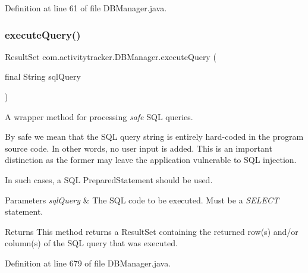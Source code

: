 Definition at line 61 of file D\+B\+Manager.\+java.

\mbox{\label{classcom_1_1activitytracker_1_1_d_b_manager_adef71a18dc05536d80e83311841e1953}} 
\subsubsection{\texorpdfstring{execute\+Query()}{executeQuery()}}
{\footnotesize\ttfamily Result\+Set com.\+activitytracker.\+D\+B\+Manager.\+execute\+Query (\begin{DoxyParamCaption}\item[{final String}]{sql\+Query }\end{DoxyParamCaption})\hspace{0.3cm}{\ttfamily [private]}}

A wrapper method for processing {\itshape safe} S\+QL queries.

By safe we mean that the S\+QL query string is entirely hard-\/coded in the program source code. In other words, no user input is added. This is an important distinction as the former may leave the application vulnerable to S\+QL injection.

In such cases, a S\+QL Prepared\+Statement should be used.


\begin{DoxyParams}{Parameters}
{\em sql\+Query} & The S\+QL code to be executed. Must be a {\itshape S\+E\+L\+E\+CT} statement.\\
\hline
\end{DoxyParams}
\begin{DoxyReturn}{Returns}
This method returns a Result\+Set containing the returned row(s) and/or column(s) of the S\+QL query that was executed. 
\end{DoxyReturn}


Definition at line 679 of file D\+B\+Manager.\+java.

\mbox{\label{classcom_1_1activitytracker_1_1_d_b_manager_a382397e2bdf309901d1c80ff66be69b7}} 
